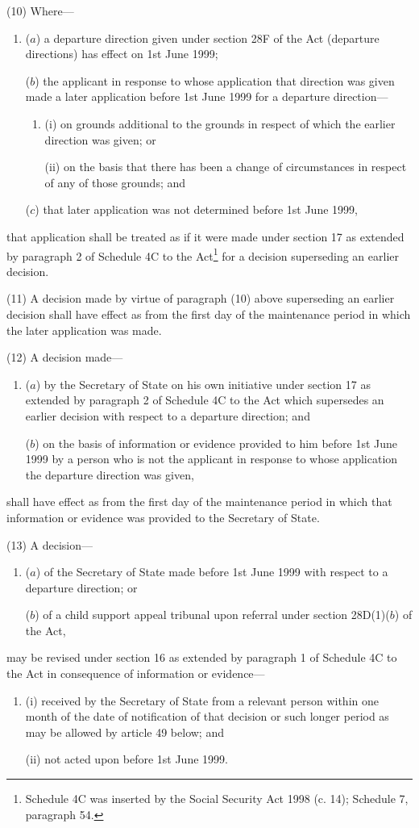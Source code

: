 \documentclass[12pt,a4paper]{article}
\begin{document}
(10) Where—
\begin{enumerate}\item[]
($a$) a departure direction given under section 28F of the Act (departure directions) has effect on 1st June 1999;

($b$) the applicant in response to whose application that direction was given made a later application before 1st June 1999 for a departure direction—
\begin{enumerate}\item[]
(i) on grounds additional to the grounds in respect of which the earlier direction was given; or

(ii) on the basis that there has been a change of circumstances in respect of any of those grounds; and
\end{enumerate}

($c$) that later application was not determined before 1st June 1999,
\end{enumerate}
that application shall be treated as if it were made under section 17 as extended by paragraph 2 of Schedule 4C to the Act\footnote{\frenchspacing Schedule 4C was inserted by the Social Security Act 1998 (c. 14); Schedule 7, paragraph 54.} for a decision superseding an earlier decision.

(11) A decision made by virtue of paragraph (10) above superseding an earlier decision shall have effect as from the first day of the maintenance period in which the later application was made.

(12) A decision made—
\begin{enumerate}\item[]
($a$) by the Secretary of State on his own initiative under section 17 as extended by paragraph 2 of Schedule 4C to the Act which supersedes an earlier decision with respect to a departure direction; and

($b$) on the basis of information or evidence provided to him before 1st June 1999 by a person who is not the applicant in response to whose application the departure direction was given,
\end{enumerate}
shall have effect as from the first day of the maintenance period in which that information or evidence was provided to the Secretary of State.

(13) A decision—
\begin{enumerate}\item[]
($a$) of the Secretary of State made before 1st June 1999 with respect to a departure direction; or

($b$) of a child support appeal tribunal upon referral under section 28D(1)($b$) of the Act,
\end{enumerate}
may be revised under section 16 as extended by paragraph 1 of Schedule 4C to the Act in consequence of information or evidence—
\begin{enumerate}\item[]
(i) received by the Secretary of State from a relevant person within one month of the date of notification of that decision or such longer period as may be allowed by article 49 below; and

(ii) not acted upon before 1st June 1999.
\end{enumerate}
\end{document}
